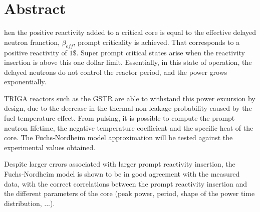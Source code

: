 %
%
%

\chapter*{Abstract}
\begin{SingleSpace}
hen the positive reactivity added to a critical core is equal to the effective delayed neutron franction, $\beta_{eff}$, prompt criticality is achieved. That corresponds to a positive reactivity of $1\$$. Super prompt critical states arise when the reactivity insertion is above this one dollar limit. Essentially, in this state of operation, the delayed neutrons do not control the reactor period, and the power grows exponentially.

TRIGA reactors such as the GSTR are able to withstand this power excursion by design, due to the decrease in the thermal non-leakage probability caused by the fuel temperature effect. From pulsing, it is possible to compute the prompt neutron lifetime, the negative temperature coefficient and the specific heat of the core. The Fuchs-Nordheim model approximation will be tested against the experimental values obtained.

Despite larger errors associated with larger prompt reactivity insertion, the Fuchs-Nordheim model is shown to be in good agreement with the measured data, with the correct correlations between the prompt reactivity insertion and the different parameters of the core (peak power, period, shape of the power time distribution, ...).

\end{SingleSpace}
\clearpage
